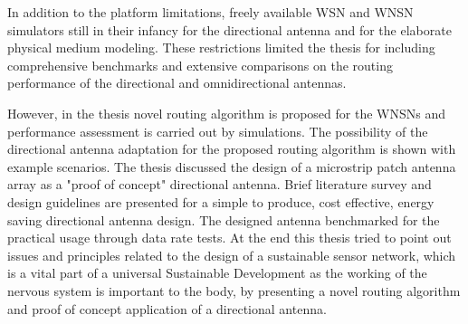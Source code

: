 \documentclass[12pt, oneandhalf, chaparabic, sees, ms]{metu}
\begin{document}
In addition to the platform limitations, freely available WSN and WNSN simulators still in their infancy for the directional antenna and
for the elaborate physical medium modeling. These restrictions limited the thesis for including comprehensive benchmarks and extensive comparisons
on the routing performance of the directional and omnidirectional antennas.

However, in the thesis novel routing algorithm is proposed for the WNSNs and performance assessment is carried out by simulations.
The possibility of the directional antenna adaptation for the proposed routing algorithm is shown with example scenarios.
The thesis discussed the design of a microstrip patch antenna array as a "proof of concept" directional antenna. Brief literature
survey and design guidelines are presented for a simple to produce, cost effective, energy saving directional antenna design. The designed
antenna benchmarked for the practical usage through data rate tests. At the end this thesis tried to point out issues and principles
related to the design of a sustainable sensor network, which is a vital part of a universal Sustainable Development as the 
working of the nervous system is important to the body, by presenting a novel routing algorithm and proof of concept application
of a directional antenna.


\end{document}
